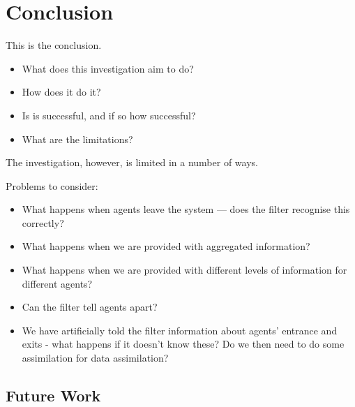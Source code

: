 \chapter{Conclusion}\label{ch:conclusion}

This is the conclusion.
\begin{itemize}
    \item What does this investigation aim to do?
    \item How does it do it?
    \item Is is successful, and if so how successful?
    \item What are the limitations?
\end{itemize}

The investigation, however, is limited in a number of ways.

Problems to consider:
\begin{itemize}
    \item What happens when agents leave the system --- does the filter
        recognise this correctly?
    \item What happens when we are provided with aggregated information?
    \item What happens when we are provided with different levels of information
        for different agents?
    \item Can the filter tell agents apart?
    \item We have artificially told the filter information about agents'
        entrance and exits - what happens if it doesn't know these? Do we then
        need to do some assimilation for data assimilation?
\end{itemize}

\section{Future Work}\label{sec:conc:future}

